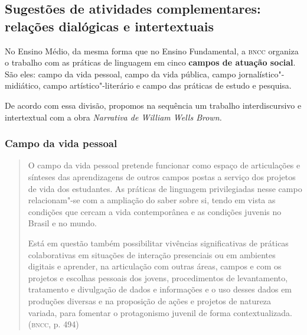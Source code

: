\documentclass[11pt]{extarticle}
\begin{document}
\begin{enumerate}
\subsection{Sugestões de atividades complementares: relações dialógicas e
intertextuais}


No Ensino Médio, da mesma forma que no Ensino Fundamental, a \textsc{bncc}
organiza o trabalho com as práticas de linguagem em cinco \textbf{campos
de atuação social}. São eles: campo da vida pessoal, campo da vida
pública, campo jornalístico"-midiático, campo artístico"-literário e campo
das práticas de estudo e pesquisa.

De acordo com essa divisão, propomos na sequência um trabalho
interdiscursivo e intertextual com a obra \emph{Narrativa de William
Wells Brown.}

\subsubsection{Campo da vida pessoal}

\begin{quote}
O campo da vida pessoal pretende funcionar como espaço de articulações
e sínteses das aprendizagens de outros campos postas a serviço dos
projetos de vida dos estudantes. As práticas de linguagem privilegiadas
nesse campo relacionam"-se com a ampliação do saber sobre si, tendo em
vista as condições que cercam a vida contemporânea e as condições
juvenis no Brasil e no mundo.

Está em questão também possibilitar vivências significativas de práticas
colaborativas em situações de interação presenciais ou em ambientes
digitais e aprender, na articulação com outras áreas, campos e com os
projetos e escolhas pessoais dos jovens, procedimentos de levantamento,
tratamento e divulgação de dados e informações e o uso desses dados em
produções diversas e na proposição de ações e projetos de natureza
variada, para fomentar o protagonismo juvenil de forma
contextualizada. (\textsc{bncc}, p. 494)
\end{quote}


\end{enumerate}
\end{document}
